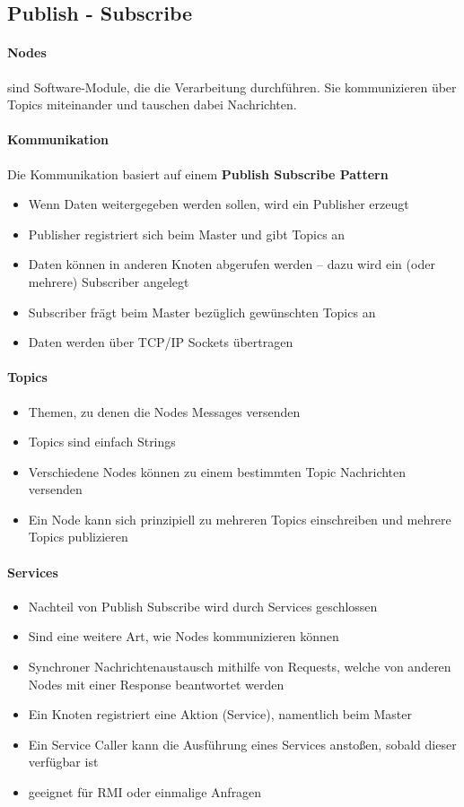 \subsection{Publish - Subscribe}
\paragraph{Nodes} sind Software-Module, die die Verarbeitung durchführen. Sie kommunizieren über Topics miteinander und tauschen dabei Nachrichten.
\paragraph{Kommunikation}
Die Kommunikation basiert auf einem \textbf{Publish Subscribe Pattern}
\begin{itemize}
	\item Wenn Daten weitergegeben werden sollen, wird ein Publisher erzeugt
	\item Publisher registriert sich beim Master und gibt Topics an
	\item Daten können in anderen Knoten abgerufen werden -- dazu wird ein (oder mehrere) Subscriber angelegt
	\item Subscriber frägt beim Master bezüglich gewünschten Topics an
	\item Daten werden über TCP/IP Sockets übertragen
\end{itemize}
\paragraph{Topics}
\begin{itemize}
	\item Themen, zu denen die Nodes Messages versenden
	\item Topics sind einfach Strings
	\item Verschiedene Nodes können zu einem bestimmten Topic Nachrichten versenden
	\item Ein Node kann sich prinzipiell zu mehreren Topics einschreiben und mehrere Topics publizieren
\end{itemize}
\paragraph{Services}
\begin{itemize}
	\item Nachteil von Publish Subscribe wird durch Services geschlossen
	\item Sind eine weitere Art, wie Nodes kommunizieren können
	\item Synchroner Nachrichtenaustausch mithilfe von Requests, welche von anderen Nodes mit einer Response beantwortet werden
	\item Ein Knoten registriert eine Aktion (Service), namentlich beim Master
	\item Ein Service Caller kann die Ausführung eines Services anstoßen, sobald dieser verfügbar ist
	\item geeignet für RMI oder einmalige Anfragen
\end{itemize}
